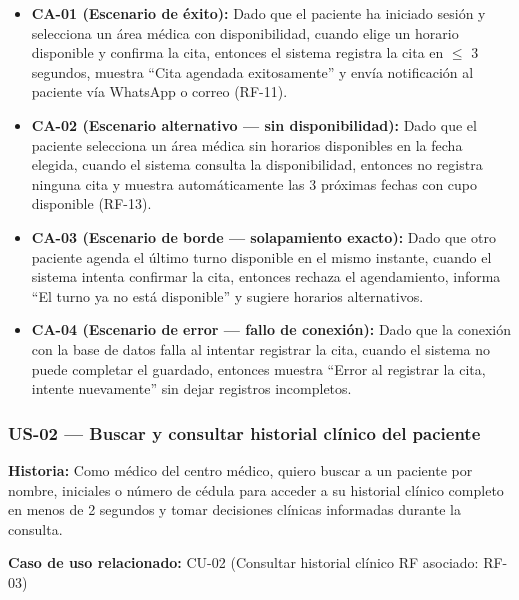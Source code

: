 \documentclass[11pt,a4paper]{article}
\providecommand{\tightlist}{%
	\setlength{\itemsep}{0pt}\setlength{\parskip}{0pt}}
\begin{document}
	\begin{itemize}
		\tightlist
		\item
		\textbf{CA-01 (Escenario de éxito):} Dado que el paciente ha iniciado sesión y selecciona un área médica con disponibilidad, cuando elige un horario disponible y confirma la cita, entonces el sistema registra la cita en \(\leq\) 3 segundos, muestra ``Cita agendada exitosamente'' y envía notificación al paciente vía WhatsApp o correo (RF-11).
		\item
		\textbf{CA-02 (Escenario alternativo --- sin disponibilidad):} Dado que el paciente selecciona un área médica sin horarios disponibles en la fecha elegida, cuando el sistema consulta la disponibilidad, entonces no registra ninguna cita y muestra automáticamente las 3 próximas fechas con cupo disponible (RF-13).
		\item
		\textbf{CA-03 (Escenario de borde --- solapamiento exacto):} Dado que otro paciente agenda el último turno disponible en el mismo instante, cuando el sistema intenta confirmar la cita, entonces rechaza el agendamiento, informa ``El turno ya no está disponible'' y sugiere horarios alternativos.
		\item
		\textbf{CA-04 (Escenario de error --- fallo de conexión):} Dado que la conexión con la base de datos falla al intentar registrar la cita, cuando el sistema no puede completar el guardado, entonces muestra ``Error al registrar la cita, intente nuevamente'' sin dejar registros incompletos.
	\end{itemize}
	
	\subsubsection{US-02 --- Buscar y consultar historial clínico del paciente}
	
	\textbf{Historia:} Como médico del centro médico, quiero buscar a un paciente por nombre, iniciales o número de cédula para acceder a su historial clínico completo en menos de 2 segundos y tomar decisiones clínicas informadas durante la consulta.
	
	\textbf{Caso de uso relacionado:} CU-02 (Consultar historial clínico \textbar{} RF asociado: RF-03)
	
\end{document}

